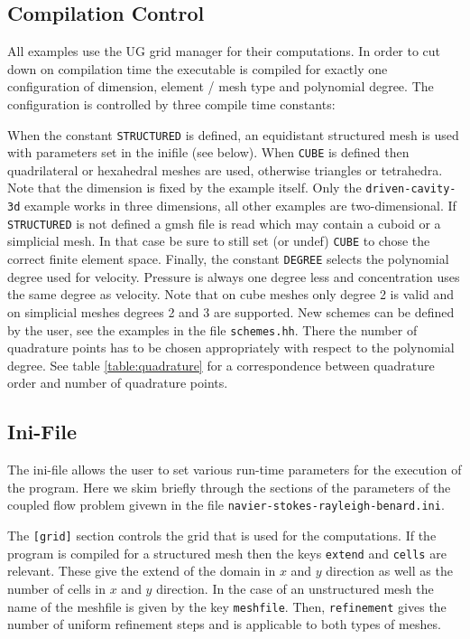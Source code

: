 \documentclass[a4paper,12pt]{article}
\theoremstyle{definition}
\begin{document}
\subsection{Compilation Control}

All examples use the UG grid manager for their computations.
In order to cut down on compilation time the executable is compiled for exactly one configuration
of dimension, element / mesh type and polynomial degree. The configuration is controlled by three compile time constants:

When the constant \lstinline{STRUCTURED} is defined, an equidistant structured mesh is used with
parameters set in the inifile (see below). When \lstinline{CUBE} is defined then quadrilateral or
hexahedral meshes are used, otherwise triangles or tetrahedra.
Note that the dimension is fixed by the example itself. Only the \lstinline{driven-cavity-3d}
example works in three dimensions, all other examples are two-dimensional. 
If \lstinline{STRUCTURED} is not defined a gmsh file is read which may contain a cuboid or
a simplicial mesh. In that case be sure to still set (or undef) \lstinline{CUBE} to chose the correct finite element space.
Finally, the constant \lstinline{DEGREE}
selects the polynomial degree used for velocity. Pressure is always one degree less and concentration uses
the same degree as velocity. Note that on cube meshes only degree 2 is valid and on simplicial meshes degrees 2 and 3
are supported. New schemes can be defined by the user, see the examples
in the file \lstinline{schemes.hh}. There the number of quadrature
points has to be chosen appropriately with respect to the polynomial
degree. See table \ref{table:quadrature} for a correspondence between
quadrature order and number of quadrature points.

\subsection{Ini-File}

The ini-file allows the user to set various run-time parameters for the
execution of the program. Here we skim briefly through the sections of the
parameters of the coupled flow problem givewn in the file \lstinline{navier-stokes-rayleigh-benard.ini}.

The  \lstinline{[grid]} section controls the grid that is used for the computations.
If the program is compiled for a structured mesh then the keys \lstinline{extend}
and \lstinline{cells} are relevant. These give the extend of the domain in $x$ and $y$ direction
as well as the number of cells in $x$ and $y$ direction. In the case of an unstructured mesh the
name of the meshfile is given by the key \lstinline{meshfile}. Then, \lstinline{refinement} gives
the number of uniform refinement steps and is applicable to both types of meshes.
\end{document}
